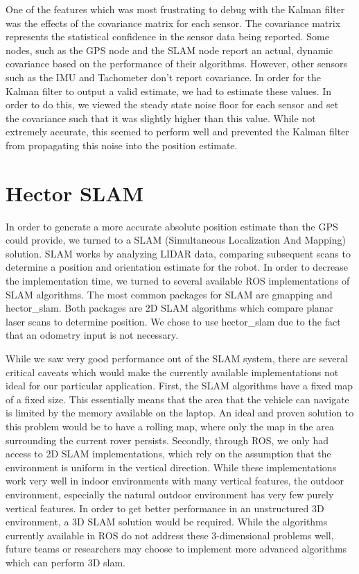 One of the features which was most frustrating to debug with the Kalman filter was the effects of the covariance matrix for each sensor. The covariance matrix represents the statistical confidence in the sensor data being reported. Some nodes, such as the GPS node and the SLAM node report an actual, dynamic covariance based on the performance of their algorithms. However, other sensors such as the IMU and Tachometer don't report covariance. In order for the Kalman filter to output a valid estimate, we had to estimate these values. In order to do this, we viewed the steady state noise floor for each sensor and set the covariance such that it was slightly higher than this value. While not extremely accurate, this seemed to perform well and prevented the Kalman filter from propagating this noise into the position estimate.

\section{Hector SLAM}

In order to generate a more accurate absolute position estimate than the GPS could provide, we turned to a SLAM (Simultaneous Localization And Mapping) solution. SLAM works by analyzing LIDAR data, comparing subsequent scans to determine a position and orientation estimate for the robot. In order to decrease the implementation time, we turned to several available ROS implementations of SLAM algorithms. The most common packages for SLAM are gmapping and hector\_slam. Both packages are 2D SLAM algorithms which compare planar laser scans to determine position. We chose to use hector\_slam due to the fact that an odometry input is not necessary.  

While we saw very good performance out of the SLAM system, there are several critical caveats which would make the currently available implementations not ideal for our particular application. First, the SLAM algorithms have a fixed map of a fixed size. This essentially means that the area that the vehicle can navigate is limited by the memory available on the laptop. An ideal and proven solution to this problem would be to have a rolling map, where only the map in the area surrounding the current rover persists. Secondly, through ROS, we only had access to 2D SLAM implementations, which rely on the assumption that the environment is uniform in the vertical direction. While these implementations work very well in indoor environments with many vertical features, the outdoor environment, especially the natural outdoor environment has very few purely vertical features. In order to get better performance in an unstructured 3D environment, a 3D SLAM solution would be required. While the algorithms currently available in ROS do not address these 3-dimensional problems well, future teams or researchers may choose to implement more advanced algorithms which can perform 3D slam.

